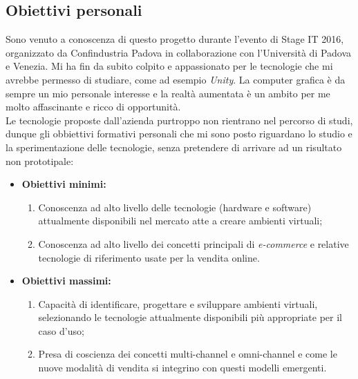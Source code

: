\subsection{Obiettivi personali}

Sono venuto a conoscenza di questo progetto durante l'evento di Stage IT 2016, organizzato da Confindustria Padova in collaborazione con l'Università di Padova e Venezia. Mi ha fin da subito colpito e appassionato per le tecnologie che mi avrebbe permesso di studiare, come ad esempio \textit{Unity}. La computer grafica è da sempre un mio personale interesse e la realtà aumentata è un ambito per me molto affascinante e ricco di opportunità. \\
Le tecnologie proposte dall'azienda purtroppo non rientrano nel percorso di studi, dunque gli obbiettivi formativi personali che mi sono posto riguardano lo studio e la sperimentazione delle tecnologie, senza pretendere di arrivare ad un risultato non prototipale:

\begin{itemize}
	\item \textbf{Obiettivi minimi:}
	\begin{enumerate}
		\item Conoscenza ad alto livello delle tecnologie (hardware e software) attualmente disponibili nel mercato atte a creare ambienti virtuali;
		\item Conoscenza ad alto livello dei concetti principali di \textit{e-commerce} e relative tecnologie di riferimento usate per la vendita online.
	\end{enumerate}
	\item \textbf{Obiettivi massimi:}
	\begin{enumerate}
		\item Capacità di identificare, progettare e sviluppare ambienti virtuali, selezionando le tecnologie attualmente disponibili più appropriate per il caso d'uso;
		\item Presa di coscienza dei concetti multi-channel e omni-channel e come le nuove modalità di vendita si integrino con questi modelli emergenti.
	\end{enumerate}
\end{itemize}